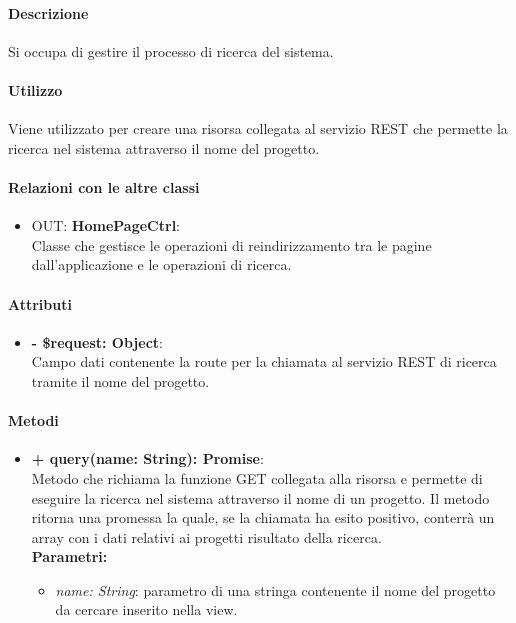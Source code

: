 		\paragraph{Descrizione}
		Si occupa di gestire il processo di ricerca del sistema.
		
		\paragraph{Utilizzo}
		Viene utilizzato per creare una risorsa collegata al servizio \gls{REST} che permette la ricerca nel sistema attraverso il nome del progetto.
		
		\paragraph{Relazioni con le altre classi}
		\begin{itemize}
			\item OUT: \textbf{HomePageCtrl}:\\
			Classe che gestisce le operazioni di reindirizzamento tra le pagine dall'applicazione e le operazioni di ricerca.
		\end{itemize}
		
		\paragraph{Attributi}
		\begin{itemize}
			\item \textbf{- \$request: Object}:\\
			Campo dati contenente la route per la chiamata al servizio \gls{REST} di ricerca tramite il nome del progetto.
		\end{itemize}	
		
		\paragraph{Metodi}
		\begin{itemize}
			\item \textbf{+ query(name: String): Promise}:\\
			Metodo che richiama la funzione GET collegata alla risorsa e permette di eseguire la ricerca nel sistema attraverso il nome di un progetto. Il metodo ritorna una promessa la quale, se la chiamata ha esito positivo, conterrà un array con i dati relativi ai progetti risultato della ricerca.\\
			\textbf{Parametri:}\\
			\begin{itemize}
				\item \textit{name: String}: parametro di una stringa contenente il nome del progetto da cercare inserito nella view.
			\end{itemize}
		\end{itemize}
\newpage
		
